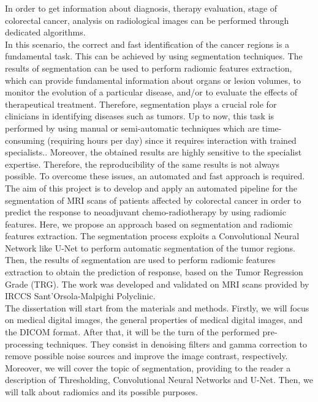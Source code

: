 \documentclass{standalone}
\begin{document}
In order to get information about diagnosis, therapy evaluation, stage of colorectal cancer, analysis on radiological images can be performed through dedicated algorithms.
\\
In this scenario, the correct and fast identification of the cancer regions is a fundamental task.
This can be achieved by using segmentation techniques.
The results of segmentation can be used to perform radiomic features extraction, which can provide fundamental information about organs or lesion volumes, to monitor the evolution of a particular disease, and/or to evaluate the effects of therapeutical treatment.
Therefore, segmentation plays a crucial role for clinicians in identifying diseases such as tumors.
Up to now, this task is performed by using manual or semi-automatic techniques which are time-consuming (requiring hours per day) since it requires interaction with trained specialists.\cite{tesicoppola, jovana}.
Moreover, the obtained results are highly sensitive to the specialist expertise.
Therefore, the reproducibility of the same results is not always possible\cite{Trebeschi2017}.
To overcome these issues, an automated and fast approach is required.
\\
The aim of this project is to develop and apply an automated pipeline for the segmentation of MRI scans of patients affected by colorectal cancer in order to predict the response to neoadjuvant chemo-radiotherapy by using radiomic features. 
Here, we propose an approach based on segmentation and radiomic features extraction.
The segmentation process exploits a Convolutional Neural Network like U-Net to perform automatic segmentation of the tumor regions.
Then, the results of segmentation are used to perform radiomic features extraction to obtain the prediction of response, based on the Tumor Regression Grade (TRG).
The work was developed and validated on MRI scans provided by IRCCS Sant’Orsola-Malpighi Polyclinic.
\\
The dissertation will start from the materials and methods.
Firstly, we will focus on medical digital images, the general properties of medical digital images, and the DICOM format.
After that, it will be the turn of the performed pre-processing techniques.
They consist in denoising filters and gamma correction to remove possible noise sources and improve the image contrast, respectively.
Moreover, we will cover the topic of segmentation, providing to the reader a description of Thresholding, Convolutional Neural Networks and U-Net.
Then, we will talk about radiomics and its possible purposes.
\end{document}
